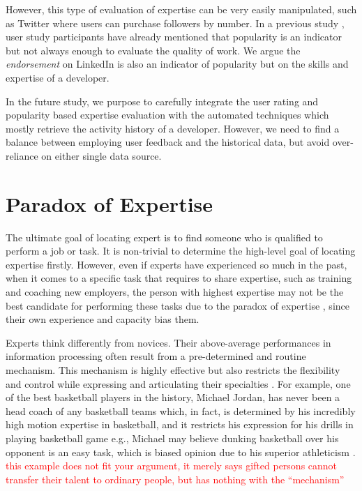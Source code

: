 However, this type of evaluation of expertise can be very easily manipulated,  such as Twitter where users can purchase followers by number. In a previous study \cite{marlow2013activity}, user study participants have already mentioned that popularity is an indicator but not always enough to evaluate the quality of work. We argue the \textit{endorsement} on LinkedIn is also an indicator of popularity but on the skills and expertise of a developer.

In the future study, we purpose to carefully integrate the user rating and popularity based expertise evaluation with the automated techniques which mostly retrieve the activity history of a developer. However, we need to find a balance between employing user feedback and the historical data, but avoid over-reliance on either single data source.

\section{Paradox of Expertise}

The ultimate goal of locating expert is to find someone who is qualified to perform a job or task. It is non-trivial to determine the high-level goal of locating expertise firstly. However, even if experts have experienced so much in the past, when it comes to a specific task that requires to share expertise, such as training and coaching new employers, the person with highest expertise may not be the best candidate for performing these tasks due to the paradox of expertise \cite{dror2011paradox}, since their own experience and capacity \cite{liu2013expertise} bias them.

Experts think differently from novices. Their above-average performances in information processing often result from a pre-determined and routine mechanism. This mechanism is highly effective but also restricts the flexibility and control while expressing and articulating their specialties \cite{dror2011paradox}. For example, one of the best basketball players in the history, Michael Jordan, has never been a head coach of any basketball teams which, in fact, is determined by his incredibly high motion expertise in basketball, and it restricts his expression for his drills in playing basketball game e.g., Michael may believe dunking basketball over his opponent is an easy task, which is biased opinion due to his superior athleticism \cite{staff_nba.com_2017}. \textcolor{red}{this example does not fit your argument, it merely says gifted persons cannot transfer their  talent to ordinary people, but has nothing with the ``mechanism''}

